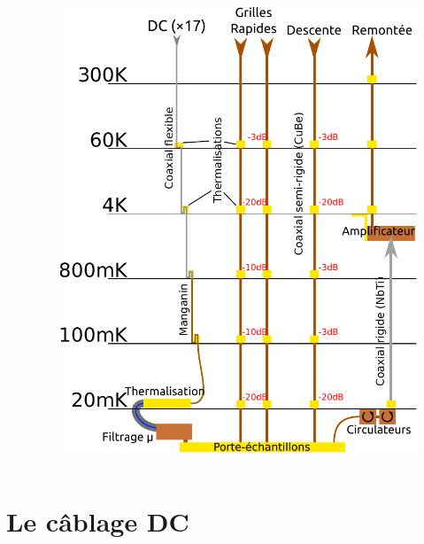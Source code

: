 \documentclass[10pt,a9paper,handout]{beamer} \usepackage[utf8]{inputenc} \usepackage[francais]{babel} \usepackage[T1]{fontenc}
\begin{document}
\begin{frame}
\begin{columns}[T]
\begin{column}{0.6\textwidth}
    \end{column}
    \begin{column}{0.4\textwidth}
        \vspace*{6mm}
        \begin{figure}[H]
            \includegraphics[width=\textwidth]{Images/Cablage_schema}
        \end{figure}
    \end{column}
    \end{columns}
\end{frame}
\section{Le câblage DC}
\end{document}
